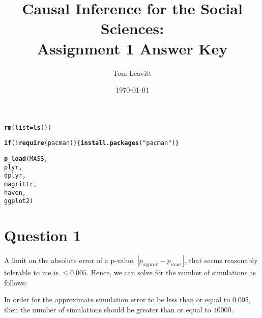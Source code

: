 \documentclass[11pt]{article}\usepackage[]{graphicx}\usepackage[]{color}
\makeatletter
\newcommand{\hlstr}[1]{\textcolor[rgb]{0.192,0.494,0.8}{#1}}%
\newcommand{\hlopt}[1]{\textcolor[rgb]{0,0,0}{#1}}%
\newcommand{\hlstd}[1]{\textcolor[rgb]{0.345,0.345,0.345}{#1}}%
\newcommand{\hlkwa}[1]{\textcolor[rgb]{0.161,0.373,0.58}{\textbf{#1}}}%
\newcommand{\hlkwc}[1]{\textcolor[rgb]{0.333,0.667,0.333}{#1}}%
\newcommand{\hlkwd}[1]{\textcolor[rgb]{0.737,0.353,0.396}{\textbf{#1}}}%
\newenvironment{kframe}{%
 \def\at@end@of@kframe{}%
 \ifinner\ifhmode%
  \def\at@end@of@kframe{\end{minipage}}%
  \begin{minipage}{\columnwidth}%
 \fi\fi%
 \def\FrameCommand##1{\hskip\@totalleftmargin \hskip-\fboxsep
 \colorbox{shadecolor}{##1}\hskip-\fboxsep
     \hskip-\linewidth \hskip-\@totalleftmargin \hskip\columnwidth}%
 \MakeFramed {\advance\hsize-\width
   \@totalleftmargin\z@ \linewidth\hsize
   \@setminipage}}%
 {\par\unskip\endMakeFramed%
 \at@end@of@kframe}
\newenvironment{knitrout}{}{} %
\theoremstyle{newstyle}
\makeatother
\begin{document}
\begin{titlepage}
\title{Causal Inference for the Social Sciences: \\
Assignment 1 Answer Key}
\author{Tom Leavitt}
\date{\today}
\maketitle

\end{titlepage}
\tableofcontents
\clearpage

\doublespacing

\maketitle

\begin{knitrout}
\color{fgcolor}\begin{kframe}
\begin{alltt}
\hlkwd{rm}\hlstd{(}\hlkwc{list}\hlstd{=}\hlkwd{ls}\hlstd{())}

\hlkwa{if}\hlstd{(}\hlopt{!}\hlkwd{require}\hlstd{(pacman)) \{}\hlkwd{install.packages}\hlstd{(}\hlstr{"pacman"}\hlstd{)\}}
\end{alltt}


{\ttfamily\noindent\itshape\color{messagecolor}{\#\# Loading required package: pacman}}

{\ttfamily\noindent\color{warningcolor}{\#\# Warning: package 'pacman' was built under R version 3.3.2}}\begin{alltt}
\hlkwd{p_load}\hlstd{(MASS,}
       \hlstd{plyr,}
       \hlstd{dplyr,}
       \hlstd{magrittr,}
       \hlstd{haven,}
       \hlstd{ggplot2)}
\end{alltt}
\end{kframe}
\end{knitrout}

\section{Question 1}

A limit on the absolute error of a p-value, $\left|p_{\text{approx}} - p_{\text{exact}}\right|$, that seems reasonably tolerable to me is $\leq 0.005$. Hence, we can solve for the number of simulations as follows:


In order for the approximate simulation error to be less than or equal to 0.005, then the number of simulations should be greater than or equal to $40000$.
\end{document}
